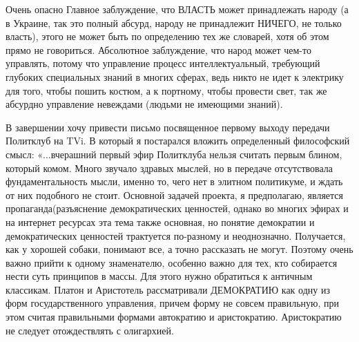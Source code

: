 Очень опасно Главное заблуждение, что ВЛАСТЬ может принадлежать народу (а в
Украине, так это полный абсурд, народу не принадлежит НИЧЕГО, не только
власть), этого не может быть по определению тех же словарей, хотя об этом
прямо не говориться. Абсолютное заблуждение, что народ может чем-то
управлять, потому что управление процесс интеллектуальный, требующий
глубоких специальных знаний в многих сферах, ведь никто не идет к
электрику для того, чтобы пошить костюм, а к портному, чтобы провести
свет, так же абсурдно управление невеждами (людьми не имеющими знаний). 

В завершении хочу привести письмо посвященное первому выходу передачи
Политклуб на TVi. В который я постарался вложить определенный философский
смысл: «...вчерашний первый эфир Политклуба нельзя считать первым
блином, который комом. Много звучало здравых мыслей, но в передаче
отсутствовала фундаментальность мысли, именно то, чего нет в элитном
политикуме, и ждать от них подобного не стоит. Основной задачей проекта, я
предполагаю, является пропаганда(разъяснение демократических ценностей, однако
во многих эфирах и на интернет ресурсах эта тема также основная, но понятие
демократии и демократических ценностей трактуется по-разному и
неоднозначно. Получается, как у хорошей собаки, понимают все, а точно рассказать
не могут. Поэтому очень важно прийти к одному знаменателю, особенно важно для
тех, кто собирается нести суть принципов в массы. Для этого нужно обратиться к
античным классикам. Платон и Аристотель рассматривали ДЕМОКРАТИЮ как одну из
форм государственного управления, причем форму не совсем правильную, при этом
считая правильными формами автократию и аристократию. Аристократию не следует
отождествлять с олигархией. 

